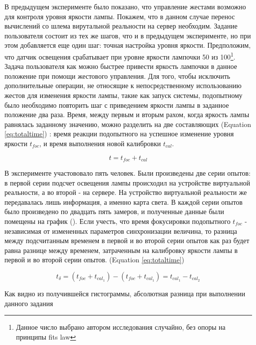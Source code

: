 В предыдущем эксперименте было показано, что управление жестами возможно для контроля уровня яркости лампы. Покажем, что в данном случае перенос вычислений со шлема вирутальной реальности на сервер необходим. Задание пользователя состоит из тех же шагов, что и в предыдущем эксперименте, но при этом добавляется еще один шаг: точная настройка уровня яркости. Предположим, что датчик освещения срабатывает при уровне яркости лампочки 50 из 100\footnote{Данное число выбрано автором исследования случайно, без опоры на принципы fits law}. Задача пользователя как можно быстрее привести яркость лампочки в данное положение при помощи жестового управления. Для того, чтобы исключить дополнительные операции, не относящие к непосредственному использованию жестов для изменения яркости лампы, такие как запуск системы, подопытному было необходимо повторить шаг с приведением яркости лампы в заданное положение два раза. Время, между первым и вторым рахом, когда яркость лампы равнялась заданному значению, можно разделить на две составляющих (Equation \eqref{eq:totaltime}) : время реакции подопытного на успешное изменение уровня яркости $t_{foc}$, и время выполнения новой калибровки $t_{cal}$.

\begin{equation}
  t = t_{foc} + t_{cal}
  \label{eq:totaltime}
\end{equation}

В эксперименте участововало пять человек. Были произведены две серии опытов: в первой серии подсчет освещения лампы происходил на устройстве виртуальной реальности, а во второй - на сервере. На устройство виртуальной реальности же передавалась лишь информация, а именно карта света. В каждой серии опытов было произведено по двадцать пять замеров, и полученные данные были помещены на график (). Если учесть, что время фокусировки подопытного $t_{foc}$ - независимая от измененных параметров синхронизации величина, то разница между подсчитанным временем в первой и во второй серии опытов как раз будет равна разнице между временем, затраченным на калибровку яркости лампы в первой и во второй серии опытов. (Equation \eqref{eq:totaltime})

\begin{equation}
  t_{\delta} = (t_{foc} + t_{cal_1}) - (t_{foc} + t_{cal_1}) = t_{cal_1} - t_{cal_2}
  \label{eq:deltatime}
\end{equation}

Как видно из получившейся гистограммы, абсолютная разница при выполнении данного задания 

